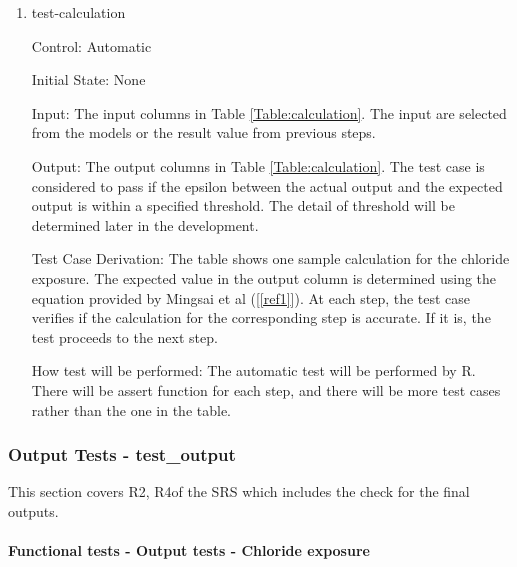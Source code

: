 \documentclass[12pt, titlepage]{article}
\newcommand{\reref}[1]{\ref{#1}}
\begin{document}
\begin{enumerate}

\item{test-calculation\\}
					
Control: Automatic 
					
Initial State: None 
					
Input: The input columns in Table \ref{Table:calculation}. The input are selected from the models or the result value from previous steps. 
					
Output: The output columns in Table \ref{Table:calculation}. The test case is considered to pass if the epsilon between the actual output and the expected output is within a specified threshold. The detail  of threshold will be determined later in the development.

Test Case Derivation: The table shows one sample calculation for the chloride exposure. The expected value in the output column is determined using the equation provided by Mingsai et al ([\reref{ref1}]). At each step, the test case verifies if the calculation for the corresponding step is accurate. If it is, the test proceeds to the next step. 
					
How test will be performed: The automatic test will be performed by R. There will be assert function for each step, and there will be more test cases rather than the one in the table.

\end{enumerate}





\subsubsection{Output Tests - test\_output}\label{t_output}
This section covers R2, R4of the SRS which includes the check for the final outputs.

		
\paragraph{Functional tests - Output tests - Chloride exposure}
\end{document}
